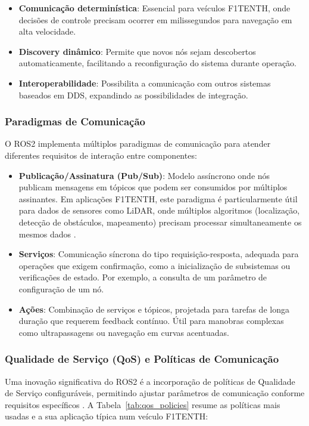 \begin{itemize}
    \item \textbf{Comunicação determinística}: Essencial para veículos F1TENTH, onde decisões de controle precisam ocorrer em milissegundos para navegação em alta velocidade.
    \item \textbf{Discovery dinâmico}: Permite que novos nós sejam descobertos automaticamente, facilitando a reconfiguração do sistema durante operação.
    \item \textbf{Interoperabilidade}: Possibilita a comunicação com outros sistemas baseados em DDS, expandindo as possibilidades de integração.
\end{itemize}

\subsubsection{Paradigmas de Comunicação}

O ROS2 implementa múltiplos paradigmas de comunicação para atender diferentes
requisitos de interação entre componentes:

\begin{itemize}
    \item \textbf{Publicação/Assinatura (Pub/Sub)}: Modelo assíncrono onde nós publicam mensagens em tópicos que podem ser consumidos por múltiplos assinantes. Em aplicações F1TENTH, este paradigma é particularmente útil para dados de sensores como LiDAR, onde múltiplos algoritmos (localização, detecção de obstáculos, mapeamento) precisam processar simultaneamente os mesmos dados \cite{staranowicz2013survey}.
    \item \textbf{Serviços}: Comunicação síncrona do tipo requisição-resposta, adequada para operações que exigem confirmação, como a inicialização de subsistemas ou verificações de estado. Por exemplo, a consulta de um parâmetro de configuração de um nó.
    \item \textbf{Ações}: Combinação de serviços e tópicos, projetada para tarefas de longa duração que requerem feedback contínuo. Útil para manobras complexas como ultrapassagens ou navegação em curvas acentuadas.
\end{itemize}

\subsubsection{Qualidade de Serviço (QoS) e Políticas de Comunicação}

Uma inovação significativa do ROS2 é a incorporação de políticas de Qualidade
de Serviço configuráveis, permitindo ajustar parâmetros de comunicação conforme
requisitos específicos \cite{gutierrez2019time}. A
Tabela~\ref{tab:qos_policies} resume as políticas mais usadas e a sua aplicação
típica num veículo F1TENTH:

